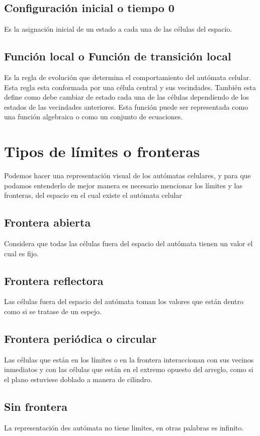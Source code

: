 \documentclass[11pt]{article}
\begin{document}
		\subsection{Configuración inicial o tiempo 0}
		Es la asignación inicial de un estado a cada una de las células del espacio.		
		
		\subsection{Función local o Función de transición local}
		Es la regla de evolución que determina el comportamiento del autómata celular. Esta regla esta conformada por una célula central y sus vecindades. También esta define como debe cambiar de estado cada una de las células dependiendo de los estados de las vecindades anteriores. Esta función puede ser representada como una función algebraica o como un conjunto de ecuaciones.
		
	
	\section{Tipos de límites o fronteras}
	Podemos hacer una representación visual de los autómatas celulares, y para que podamos entenderlo de mejor manera es necesario mencionar los límites y las fronteras, del espacio en el cual existe el autómata celular

		\subsection{Frontera abierta}
		Considera que todas las células fuera del espacio del autómata tienen un valor el cual es fijo.	
		
		\subsection{Frontera reflectora}
		Las células fuera del espacio del autómata toman los valores que están dentro como si se tratase de un espejo.

		\subsection{Frontera periódica o circular}
		Las células que están en los límites o en la frontera interaccionan con sus vecinos inmediatos y con las células que están en el extremo opuesto del arreglo, como si el plano estuviese doblado a manera de cilindro.
		
		\subsection{Sin frontera}
		La representación des autómata no tiene limites, en otras palabras es infinito.
\end{document}
